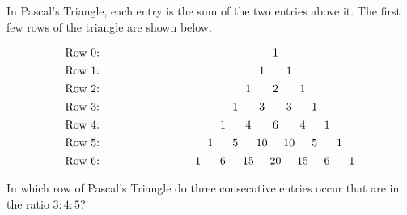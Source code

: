 In Pascal's Triangle, each entry is the sum of the two entries above it.  The first few rows of the triangle are shown below.

\[\begin{array}{c@{\hspace{8em}}
c@{\hspace{6pt}}c@{\hspace{6pt}}c@{\hspace{6pt}}c@{\hspace{4pt}}c@{\hspace{2pt}}
c@{\hspace{2pt}}c@{\hspace{2pt}}c@{\hspace{2pt}}c@{\hspace{3pt}}c@{\hspace{6pt}}
c@{\hspace{6pt}}c@{\hspace{6pt}}c} \vspace{4pt}
\text{Row 0: } &    &    &     &     &    &    & 1 &     &     &    &    &    &  \\\vspace{4pt}
\text{Row 1: } &    &    &     &     &    & 1 &    & 1  &     &    &    &    &  \\\vspace{4pt}
\text{Row 2: } &    &    &     &     & 1 &    & 2 &     & 1  &    &    &    &  \\\vspace{4pt}
\text{Row 3: } &    &    &     &  1 &    & 3 &    & 3  &     & 1 &    &    &  \\\vspace{4pt}
\text{Row 4: } &    &    & 1  &     & 4 &    & 6 &     & 4  &    & 1 &    &  \\\vspace{4pt}
\text{Row 5: } &    & 1 &     & 5  &    &10&    &10 &     & 5 &    & 1 &  \\\vspace{4pt}
\text{Row 6: } & 1 &    & 6  &     &15&    &20&     &15 &    & 6 &    & 1
\end{array}\]
In which row of Pascal's Triangle do three consecutive entries occur that are in the ratio $3: 4: 5$?